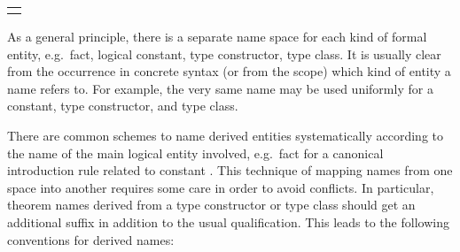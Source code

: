 \begin{isabellebody}
\begin{isamarkuptext}
  \medskip
  \begin{tabular}{l}
  \isa{binding\ {\isaliteral{2B}{\isacharplus}}\ naming\ {\isaliteral{5C3C6C6F6E6772696768746172726F773E}{\isasymlongrightarrow}}\ long\ name\ {\isaliteral{2B}{\isacharplus}}\ name\ space\ accesses}
  \end{tabular}

  \bigskip As a general principle, there is a separate name space for
  each kind of formal entity, e.g.\ fact, logical constant, type
  constructor, type class.  It is usually clear from the occurrence in
  concrete syntax (or from the scope) which kind of entity a name
  refers to.  For example, the very same name  may be used
  uniformly for a constant, type constructor, and type class.

  There are common schemes to name derived entities systematically
  according to the name of the main logical entity involved, e.g.\
  fact  for a canonical introduction rule related to
  constant \isa{c}.  This technique of mapping names from one
  space into another requires some care in order to avoid conflicts.
  In particular, theorem names derived from a type constructor or type
  class should get an additional suffix in addition to the usual
  qualification.  This leads to the following conventions for derived
  names:


\end{isamarkuptext}
\end{isabellebody}
